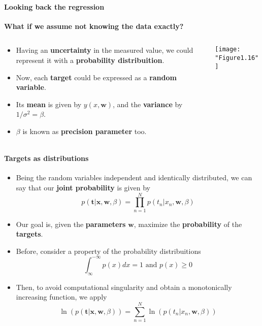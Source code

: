 \begin{frame}{\insertsubsection}
	\framesubtitle{Looking back the regression}
	\textcolor{UniGold}{\textbf{What if we assume not knowing the data exactly?}}
	\begin{columns}
	\begin{column}{0.475\textwidth}
		\begin{itemize}
			\item Having an \textcolor{UniOrange}{\textbf{uncertainty}} in the measured value, we could represent it with a \textcolor{UniOrange}{\textbf{probability distribuition}}.
			\item Now, each \textcolor{UniOrange}{\textbf{target}} could be expressed as a \textcolor{UniOrange}{\textbf{random variable}}.
			\item Its \textcolor{UniOrange}{\textbf{mean}} is given by $y(x,\mathbf{w})$, and the \textcolor{UniOrange}{\textbf{variance}} by $1/\sigma^2 = \beta$.
			\item $\beta$ is known as \textcolor{UniOrange}{\textbf{precision parameter}} too.
		\end{itemize}
		\end{column}
		\begin{column}{0.475\textwidth}  %
			\begin{center}
				\texttt{[image: "Figure1.16"]}
			\end{center}
		\end{column}
	\end{columns}
\end{frame}


\begin{frame}{\insertsubsection}	
	\framesubtitle{Targets as distributions}
	\begin{itemize}
		\item Being the random variables independent and identically distributed, we can say that our \textcolor{UniOrange}{\textbf{joint probability}} is given by
	\begin{equation*}
		p(\mathbf{t} | \mathbf{x}, \mathbf{w}, \beta) = \prod_{n=1}^N p \left( t_n | x_n, \mathbf{w}, \beta \right)
	\end{equation*}
		\item Our goal is, given the \textcolor{UniOrange}{\textbf{parameters}} $\mathbf{w}$, maximize the \textcolor{UniOrange}{\textbf{probability}} of the \textcolor{UniOrange}{\textbf{targets}}.
		\item  Before, consider a property of the probability distribuitions
		\begin{equation*}
		\int_\infty ^{-\infty} p(x) dx = 1 \text{ and } p(x) \geq 0
		\end{equation*}
		\item Then, to avoid computational singularity and obtain a monotonically increasing function, we apply
		\begin{equation*}
			\ln \left( p( \mathbf{t}| \mathbf{x}, \mathbf{w}, \beta) \right) = \sum_{n=1}^N \ln \left(   p \left( t_n | x_n, \mathbf{w}, \beta \right) \right)
		\end{equation*}		
	\end{itemize}
\end{frame}

